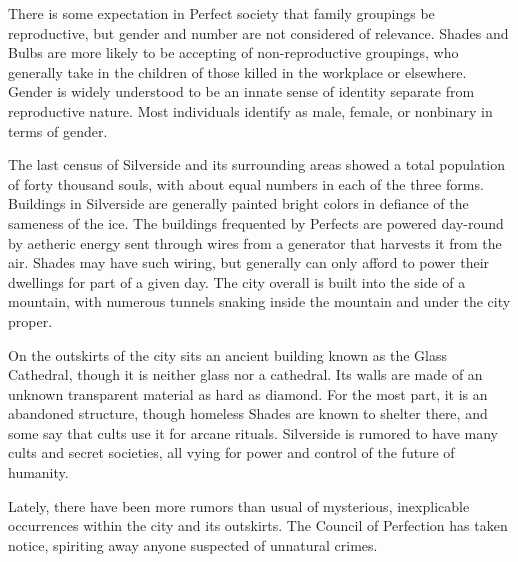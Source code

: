 \documentclass[blue]{Silversiders}
\begin{document}
There is some expectation in Perfect society that family groupings be reproductive, but gender and number are not considered of relevance. Shades and Bulbs are more likely to be accepting of non-reproductive groupings, who generally take in the children of those killed in the workplace or elsewhere. Gender is widely understood to be an innate sense of identity separate from reproductive nature. Most individuals identify as male, female, or nonbinary in terms of gender.

The last census of Silverside and its surrounding areas showed a total population of forty thousand souls, with about equal numbers in each of the three forms. Buildings in Silverside are generally painted bright colors in defiance of the sameness of the ice. The buildings frequented by Perfects are powered day-round by aetheric energy sent through wires from a generator that harvests it from the air. Shades may have such wiring, but generally can only afford to power their dwellings for part of a given day. The city overall is built into the side of a mountain, with numerous tunnels snaking inside the mountain and under the city proper.

On the outskirts of the city sits an ancient building known as the Glass Cathedral, though it is neither glass nor a cathedral. Its walls are made of an unknown transparent material as hard as diamond. For the most part, it is an abandoned structure, though homeless Shades are known to shelter there, and some say that cults use it for arcane rituals. Silverside is rumored to have many cults and secret societies, all vying for power and control of the future of humanity.

Lately, there have been more rumors than usual of mysterious, inexplicable occurrences within the city and its outskirts. The Council of Perfection has taken notice, spiriting away anyone suspected of unnatural crimes.
\end{document}
